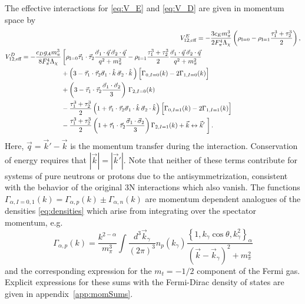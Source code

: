  The effective interactions for \eqref{eq:V_E} and \eqref{eq:V_D} are given in momentum space by
 \begin{align}
 \veff^E=-\frac{3c_Em_\pi^3}{2F_\pi^4 \Lambda_\chi}&\left(\rhozero-\rhoone\tauplusthree\right),\\
 \begin{split}
 \veff^D=-\frac{c_Dg_A m_\pi^3}{8 F_\pi^4\Lambda_\chi}&\left[\rhozero\taudot \frac{\vec{\sigma}_1\cdot\vec{q}\:\vec{\sigma}_2\cdot\vec{q} }{q^2+m_\pi^2}  - \rhoone \tauplusthree\frac{\vec{\sigma}_1\cdot\vec{q}\:\vec{\sigma}_2\cdot\vec{q} }{q^2+m_\pi^2} \right. \\
&+ \left(3 -\taudot\vec{\sigma}_1\cdot\hat{k}\:\vec{\sigma}_2\cdot\hat{k}\, \right) \Big[\Gamma_{0,I=0}(k)-2 \Gamma_{1,I=0}(k)\Big] \\
&+  \left(3 -\taudot\frac{\sigmadot}{3} \right) \,\Gamma_{2,I=0}(k) \\
 &-\tauplusthree \left(1 +\taudot\vec{\sigma}_1\cdot\hat{k}\:\vec{\sigma}_2\cdot\hat{k} \right) \Big[\Gamma_{0,I=1}(k)-2 \Gamma_{1,I=1}(k)\Big] \\
 &-\tauplusthree  \left(1+\taudot\frac{\sigmadot}{3} \right) \Gamma_{2,I=1}(k)
+ \vec{k}\leftrightarrow\vec{k}'\left.\fracphantom\right].
 \end{split} 
 \end{align}
Here, $\vec{q}=\vec{k}'-\vec{k}$ is the momentum transfer during the interaction. Conservation of energy requires that $|\vec{k}|=|\vec{k}'|$. Note that neither of these terms contribute for systems of pure neutrons or protons due to the antisymmetrization, consistent with the behavior of the original 3N interactions which also vanish. The functions $\Gamma_{\alpha,I=0,1}(k)=\Gamma_{\alpha,p}(k)\pm\Gamma_{\alpha,n}(k)$ are momentum dependent analogues of the densities \eqref{eq:densities} which arise from integrating over the spectator momentum, e.g. 
\begin{equation}
\Gamma_{\alpha,p}(k) = \frac{k^{2-\alpha}}{m_\pi^3}\int\frac{d^3\vec{k}_\gamma}{(2\pi)^3} n_{p}(k_\gamma) \frac{\left\{1,k_\gamma\cos\theta,k_\gamma^2\right\}_\alpha}{(\vec{k}-\vec{k}_\gamma)^2+m_\pi^2}
\end{equation}
and the corresponding expression for the $m_t=-1/2$ component of the Fermi gas. Explicit expressions for these sums with the Fermi-Dirac density of states are given in appendix~\ref{app:momSums}.

